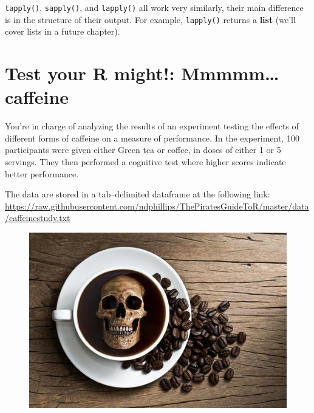 \documentclass[]{book}
\theoremstyle{definition}
\theoremstyle{definition}
\theoremstyle{remark}
\begin{document}
\texttt{tapply()}, \texttt{sapply()}, and \texttt{lapply()} all work
very similarly, their main difference is in the structure of their
output. For example, \texttt{lapply()} returns a \textbf{list} (we'll
cover lists in a future chapter).

\section{Test your R might!:
Mmmmm\ldots{}caffeine}\label{test-your-r-might-mmmmmcaffeine}

You're in charge of analyzing the results of an experiment testing the
effects of different forms of caffeine on a measure of performance. In
the experiment, 100 participants were given either Green tea or coffee,
in doses of either 1 or 5 servings. They then performed a cognitive test
where higher scores indicate better performance.

The data are stored in a tab--delimited dataframe at the following link:
\url{https://raw.githubusercontent.com/ndphillips/ThePiratesGuideToR/master/data/caffeinestudy.txt}

\begin{figure}

{\centering \includegraphics[width=0.75\linewidth]{images/skullcaffeine} 

}

\end{figure}
\end{document}
